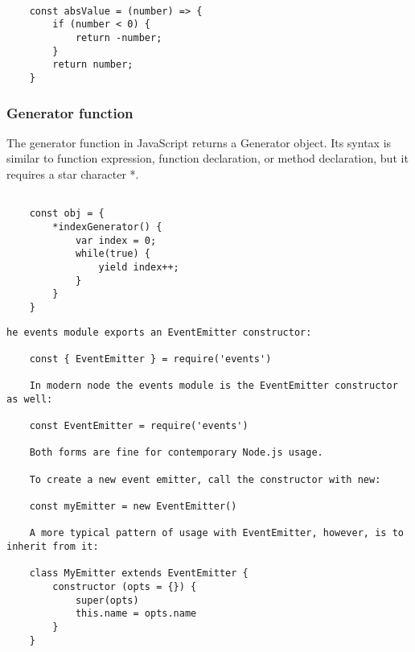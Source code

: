 \documentclass{scrartcl}
\begin{document}
\begin{lstlisting}[style=ES6]

    const absValue = (number) => {
        if (number < 0) {
            return -number;
        }
        return number;
    }

\end{lstlisting}

\subsubsection{Generator function}

The generator function in JavaScript returns a Generator object.
Its syntax is similar to function expression, function declaration, or method declaration, but it requires a star character *.

\begin{lstlisting}[style=ES6]

    const obj = {
        *indexGenerator() {
            var index = 0;
            while(true) {
                yield index++;
            }
        }
    }

\end{lstlisting}


\begin{lstlisting}[style=ES6]
    he events module exports an EventEmitter constructor:

    const { EventEmitter } = require('events')

    In modern node the events module is the EventEmitter constructor as well:

    const EventEmitter = require('events')

    Both forms are fine for contemporary Node.js usage.

    To create a new event emitter, call the constructor with new:

    const myEmitter = new EventEmitter()

    A more typical pattern of usage with EventEmitter, however, is to inherit from it:

    class MyEmitter extends EventEmitter {
        constructor (opts = {}) {
            super(opts)
            this.name = opts.name
        }
    }

\end{lstlisting}
\end{document}
